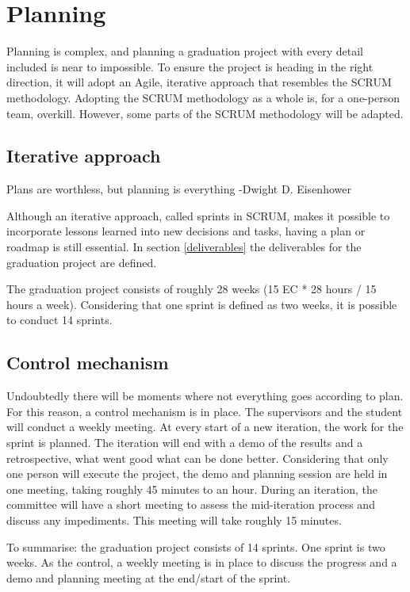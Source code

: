 \section{Planning} \label{planning}

Planning is complex, and planning a graduation project with every detail included is near to impossible. To ensure the project is heading in the right direction, it will adopt an Agile, iterative approach that resembles the SCRUM methodology. Adopting the SCRUM methodology as a whole is, for a one-person team, overkill. However, some parts of the SCRUM methodology will be adapted. 

\subsection{Iterative approach} \label{iterative-approach}
\begin{displayquote}
Plans are worthless, but planning is everything
-Dwight D. Eisenhower \cite{agile}
\end{displayquote}

Although an iterative approach, called sprints in SCRUM, makes it possible to incorporate lessons learned into new decisions and tasks, having a plan or roadmap is still essential. In section \ref{deliverables} the deliverables for the graduation project are defined. 

The graduation project consists of roughly 28 weeks (15 EC * 28 hours / 15 hours a week). Considering that one sprint is defined as two weeks, it is possible to conduct 14 sprints. 

\subsection{Control mechanism} 
Undoubtedly there will be moments where not everything goes according to plan. For this reason, a control mechanism is in place. The supervisors and the student will conduct a weekly meeting. At every start of a new iteration, the work for the sprint is planned. The iteration will end with a demo of the results and a retrospective, what went good what can be done better. Considering that only one person will execute the project, the demo and planning session are held in one meeting, taking roughly 45 minutes to an hour. During an iteration, the committee will have a short meeting to assess the mid-iteration process and discuss any impediments. This meeting will take roughly 15 minutes. 

To summarise: the graduation project consists of 14 sprints. One sprint is two weeks. As the control, a weekly meeting is in place to discuss the progress and a demo and planning meeting at the end/start of the sprint. 

